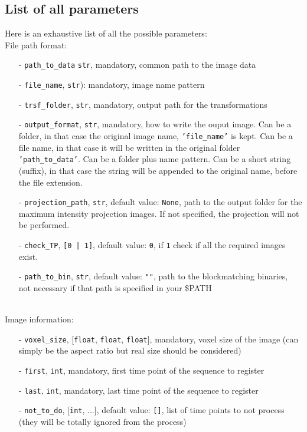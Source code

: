 \documentclass[10pt,a4paper]{book}
\newcommand{\option}[1]{{\texttt{'#1'}}}
\begin{document}
\subsection{List of all parameters}
Here is an exhaustive list of all the possible parameters:\\
File path format:
\begin{itemize}
\item[-] \texttt{path\_to\_data} \texttt{str}, mandatory, common path to the image data
\item[-] \texttt{file\_name}, \texttt{str}): mandatory, image name pattern
\item[-] \texttt{trsf\_folder}, \texttt{str}, mandatory, output path for the transformations
\item[-] \texttt{output\_format}, \texttt{str}, mandatory, how to write the ouput image. Can be a folder, in that case the original image name, \option{file\_name} is kept. Can be a file name, in that case it will be written in the original folder \option{path\_to\_data}. Can be a folder plus name pattern. Can be a short string (suffix), in that case the string will be appended to the original name, before the file extension.
\item[-] \texttt{projection\_path}, \texttt{str}, default value: \texttt{None}, path to the output folder for the maximum intensity projection images. If not specified, the projection will not be performed.
\item[-] \texttt{check\_TP}, \texttt{[0 | 1]}, default value: \texttt{0}, if \texttt{1} check if all the required images exist.
\item[-] \texttt{path\_to\_bin}, \texttt{str}, default value: \texttt{""}, path to the blockmatching binaries, not necessary if that path is specified in your \$PATH
\end{itemize}~\\
Image information:
\begin{itemize}
\item[-] \texttt{voxel\_size}, [\texttt{float}, \texttt{float}, \texttt{float}], mandatory, voxel size of the image (can simply be the aspect ratio but real size should be considered)
\item[-] \texttt{first}, \texttt{int}, mandatory, first time point of the sequence to register
\item[-] \texttt{last}, \texttt{int}, mandatory, last time point of the sequence to register
\item[-] \texttt{not\_to\_do}, [\texttt{int}, ...], default value: \texttt{[]}, list of time points to not process (they will be totally ignored from the process)
\end{itemize}~\\
\end{document}
